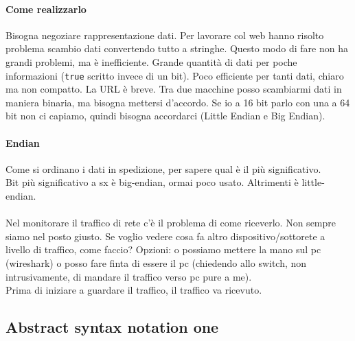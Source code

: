\documentclass[10pt]{book}
\begin{document}
\paragraph{Come realizzarlo} Bisogna negoziare rappresentazione dati. Per lavorare col web hanno risolto problema scambio dati convertendo tutto a stringhe. Questo modo di fare non ha grandi problemi, ma è inefficiente. Grande quantità di dati per poche informazioni (\texttt{true} scritto invece di un bit). Poco efficiente per tanti dati, chiaro ma non compatto. La URL è breve. Tra due macchine posso scambiarmi dati in maniera binaria, ma bisogna mettersi d'accordo. Se io a 16 bit parlo con una a 64 bit non ci capiamo, quindi bisogna accordarci (Little Endian e Big Endian).
\paragraph{Endian} Come si ordinano i dati in spedizione, per sapere qual è il più significativo.\\
Bit più significativo a sx è big-endian, ormai poco usato. Altrimenti è little-endian.\\\\
Nel monitorare il traffico di rete c'è il problema di come riceverlo. Non sempre siamo nel posto giusto. Se voglio vedere cosa fa altro dispositivo/sottorete a livello di traffico, come faccio? Opzioni: o possiamo mettere la mano sul pc (wireshark) o posso fare finta di essere il pc (chiedendo allo switch, non intrusivamente, di mandare il traffico verso pc pure a me).\\
Prima di iniziare a guardare il traffico, il traffico va ricevuto.
\subsection{Abstract syntax notation one}
\end{document}
